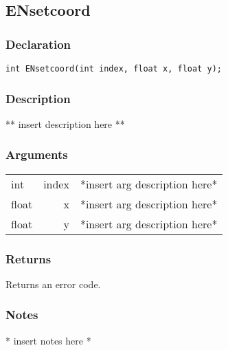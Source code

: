 \subsection{ENsetcoord}
\subsubsection{Declaration}
\begin{lstlisting}
int ENsetcoord(int index, float x, float y);
\end{lstlisting}
\subsubsection{Description}
** insert description here **
\subsubsection{Arguments}
\begin{tabular}{l r p{11cm} }
int&index&*insert arg description here* \\[6pt]
float&x&*insert arg description here* \\[6pt]
float&y&*insert arg description here* \\[6pt]
\end{tabular}
\subsubsection{Returns}
Returns an error code.
\subsubsection{Notes}
* insert notes here *